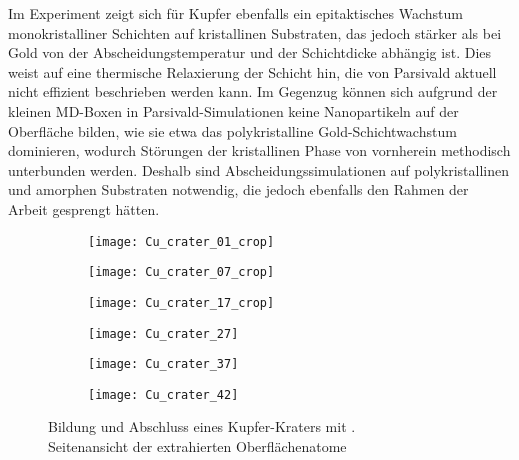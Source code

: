 Im Experiment zeigt sich für Kupfer ebenfalls ein epitaktisches Wachstum monokristalliner Schichten auf kristallinen Substraten, das jedoch stärker als bei Gold von der Abscheidungstemperatur und der Schichtdicke abhängig ist\cite{gottsche_uber_1956}.
Dies weist auf eine thermische Relaxierung der Schicht hin, die von Parsivald aktuell nicht effizient beschrieben werden kann.
Im Gegenzug können sich aufgrund der kleinen MD-Boxen in Parsivald-Simulationen keine Nanopartikeln auf der Oberfläche bilden, wie sie etwa das polykristalline Gold-Schichtwachstum dominieren, wodurch Störungen der kristallinen Phase von vornherein methodisch unterbunden werden.
Deshalb sind Abscheidungssimulationen auf polykristallinen und amorphen Substraten notwendig, die jedoch ebenfalls den Rahmen der Arbeit gesprengt hätten.

\begin{figure}[t!]

  \captionsetup[subfigure]{justification=centering,singlelinecheck=false}
  \def\subfigwidth{0.32\textwidth}

  \begin{subfigure}[t]{\subfigwidth}
    \texttt{[image: Cu\_crater\_01\_crop]}
  \end{subfigure}
  \hfill
  \begin{subfigure}[t]{\subfigwidth}
    \texttt{[image: Cu\_crater\_07\_crop]}
  \end{subfigure}
  \hfill
  \begin{subfigure}[t]{\subfigwidth}
    \texttt{[image: Cu\_crater\_17\_crop]}
  \end{subfigure}

  \begin{subfigure}[t]{\subfigwidth}
    \texttt{[image: Cu\_crater\_27]}
  \end{subfigure}
  \hfill
  \begin{subfigure}[t]{\subfigwidth}
    \texttt{[image: Cu\_crater\_37]}
  \end{subfigure}
  \hfill
  \begin{subfigure}[t]{\subfigwidth}
    \texttt{[image: Cu\_crater\_42]}
  \end{subfigure}

  \caption[Bildung und Abschluss eines Kupfer-Kraters]{
    Bildung und Abschluss eines Kupfer-Kraters mit .\\
    Seitenansicht der extrahierten Oberflächenatome
  }
  \label{fig:coppercrater}
\end{figure}

